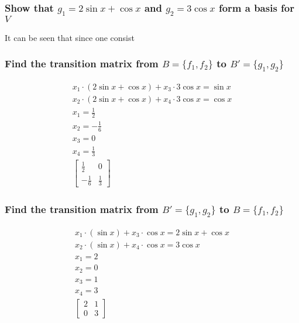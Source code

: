 \documentclass[12pt, a4paper]{article}
\begin{document}
			\subsubsection{Show that $g_1=2\sin x + \cos x$ and $g_2=3\cos x$ form a basis for $V$}
				It can be seen that since one consist
			\subsubsection{Find the transition matrix from $B=\{f_1,f_2\}$ to $B'=\{g_1,g_2\}$}
				\begin{align*}
					x_1\cdot (2\sin x + \cos x)+x_3\cdot 3\cos x = \sin x\\
					x_2\cdot (2\sin x + \cos x)+x_4\cdot 3\cos x = \cos x\\
					x_1=\frac{1}{2}\\
					x_2=-\frac{1}{6}\\
					x_3=0\\
					x_4=\frac{1}{3}\\
					\begin{bmatrix}\frac{1}{2} & 0\\ -\frac{1}{6} & \frac{1}{3}\end{bmatrix}
				\end{align*}
			\subsubsection{Find the transition matrix from $B'=\{g_1,g_2\}$ to $B=\{f_1,f_2\}$}
				\begin{align*}
					x_1\cdot (\sin x)+x_3\cdot \cos x = 2\sin x + \cos x\\
					x_2\cdot (\sin x)+x_4\cdot \cos x = 3\cos x\\
					x_1=2\\
					x_2=0\\
					x_3=1\\
					x_4=3\\
					\begin{bmatrix} 2 & 1 \\ 0 & 3\end{bmatrix}
				\end{align*}
\end{document}
